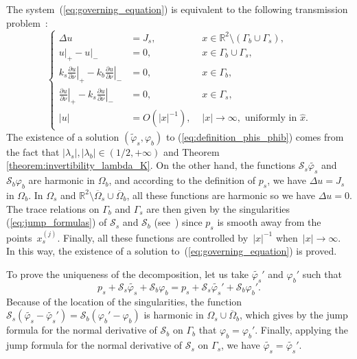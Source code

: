 \proof The system~(\ref{eq:governing_equation}) is equivalent to
the following transmission problem~\cite{allaire2007numerical}:
\begin{equation} \label{eqs210}
\left\{ \begin{alignedat}{2}\Delta u & ={J_s}, & \,\, x\in\mathbb{R}^{2}\setminus(\Gamma_{b}\cup\Gamma_{s}),\\
\left.u\right|_{+}-\left.u\right|_{-} & =0, & \,\, x\in\Gamma_{b}\cup\Gamma_{s},\\
k_{s}\left.\frac{\partial u}{\partial\nu}\right|_{+}-k_{b}\left.\frac{\partial u}{\partial\nu}\right|_{-} & =0,
& \,\, x\in\Gamma_{b},\\
\left.\frac{\partial u}{\partial\nu}\right|_{+}-k_{s}\left.\frac{\partial u}{\partial\nu}\right|_{-} & =0, &
\,\, x\in\Gamma_{s},\\
\left|u\right| & = {O}(\left|x\right|^{-1}), &
\,\,\left|x\right|\rightarrow\infty,\text{ uniformly in }\hat{x}.
\end{alignedat}
\right.
\end{equation}
The existence of a solution $(\tilde{\varphi}_s, \varphi_b)$ to
(\ref{eq:definition_phis_phib}) comes from the fact that
$|\lambda_s|, |\lambda_b|  \in (1/2, + \infty)$  and Theorem
\ref{theorem:invertibility_lambda_K}. On the other hand, the functions
$\mathcal{S}_{s}\tilde{\varphi_{s}}$ and
$\mathcal{S}_{b}\varphi_{b}$ are harmonic in $\Omega_{b}$, and
according to the definition of $p_s$, we have $\Delta u= {J_s}$ in
$\Omega_{b}$. In $\Omega_{s}$ and
$\mathbb{R}^{2}\setminus\overline{\Omega}_{s}\cup
\overline{\Omega}_{b}$, all these functions are harmonic so we
have $\Delta u=0$. The trace relations on $\Gamma_b$ and
$\Gamma_s$ are then given by the singularities
(\ref{eq:jump_formulas}) of $\mathcal{S}_{s}$ and
$\mathcal{S}_{b}$ (see~\cite{ammari2007polarization}) since $p_s$ is
smooth away from the points~$x_s^{(j)}$. Finally, all these functions
are controlled by~$\left|x\right|^{-1}$
when~$\left|x\right|\rightarrow\infty$. In this way, the existence
of a solution to~(\ref{eq:governing_equation}) is proved.

To prove the uniqueness of the decomposition, let us take
$\tilde{\varphi_{s}}'$ and $\varphi_{b}'$ such that
\[
p_s+\mathcal{S}_{s}\tilde{\varphi_{s}}+\mathcal{S}_{b}\varphi_{b}=p_s+\mathcal{S}_{s}\tilde{\varphi_{s}}'+\mathcal{S}_{b}\varphi_{b}'.
\]
 Because of the location of the singularities, the function $\mathcal{S}_{s}(\tilde{\varphi_{s}}-\tilde{\varphi_{s}}')
 =\mathcal{S}_{b}(\varphi_{b}'-\varphi_{b})$
is harmonic in $\Omega_{s}\cup\overline{\Omega}_{b}$, which gives
by the jump formula for the normal derivative of $\mathcal{S}_{b}$
on $\Gamma_b$ that $\varphi_{b}=\varphi_{b}'$. Finally, applying
the jump formula for the normal derivative of $\mathcal{S}_{s}$ on
$\Gamma_s$, we have $\tilde{\varphi_{s}}=\tilde{\varphi_{s}}'$.
\cqfd





